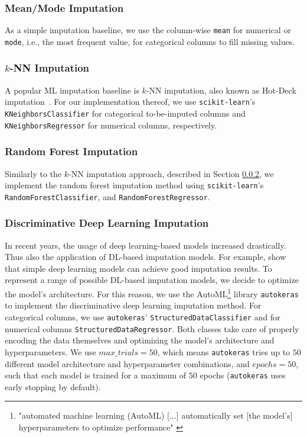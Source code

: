 \documentclass[utf8]{frontiersSCNS} %
\newcommand{\code}[1]{\texttt{#1}}
\begin{document}
\subsubsection{Mean/Mode Imputation}
\label{sec:simple_imputation}
%
As a simple imputation baseline, we use the column-wise \code{mean} for numerical or \code{mode}, i.e., the most frequent value,  for categorical columns to fill missing values.


\subsubsection{$k$-NN Imputation}
\label{sec:knKNN}
%
A popular ML imputation baseline is $k$-NN imputation, also known as Hot-Deck imputation~\citep{Batista2003}. For our implementation thereof, we use \code{scikit-learn}'s \code{KNeighborsClassifier} for categorical to-be-imputed columns and \code{KNeighborsRegressor} for numerical columns, respectively.


\subsubsection{Random Forest Imputation}
%
Similarly to the $k$-NN imputation approach, described in Section \ref{sec:knKNN}, we implement the random forest imputation method using \code{scikit-learn}'s \code{RandomForestClassifier}, and \code{RandomForestRegressor}.



\subsubsection{Discriminative Deep Learning Imputation}
\label{sec:dl_imputation}
%
In recent years, the usage of deep learning-based models increased drastically. Thus also the application of DL-based imputation models. For example, \cite{Biessmann2018a} show that simple deep learning models can achieve good imputation results. To represent a range of possible DL-based imputation models, we decide to optimize the model's architecture. For this reason, we use the AutoML\footnote{"automated machine learning (AutoML) [...] automatically set [the model's] hyperparameters to optimize performance" \cite{AutoML}} library \code{autokeras} \citep{AutoKeras} to implement the discriminative deep learning imputation method. For categorical columns, we use \code{autokeras}' \code{StructuredDataClassifier} and for numerical columns \code{StructuredDataRegressor}. Both classes take care of properly encoding the data themselves and optimizing the model's architecture and hyperparameters. We use $max\_trials = 50$, which means \code{autokeras} tries up to $50$ different model architecture and hyperparameter combinations, and $epochs = 50$, such that each model is trained for a maximum of $50$ epochs (\code{autokeras} uses early stopping by default).
\end{document}
